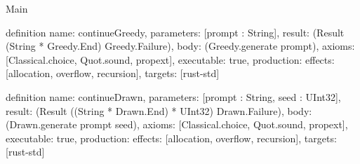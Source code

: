 \begin{lexlean}{Main}
\begin{semanticmodule}
definition{
  name: continueGreedy,
  parameters: [prompt : String],
  result: (Result (String * Greedy.End) Greedy.Failure),
  body: (Greedy.generate prompt),
  axioms: [Classical.choice, Quot.sound, propext],
  executable: true,
  production: {effects: [allocation, overflow, recursion], targets: [rust-std]}
}

definition{
  name: continueDrawn,
  parameters: [prompt : String, seed : UInt32],
  result: (Result ((String * Drawn.End) * UInt32) Drawn.Failure),
  body: (Drawn.generate prompt seed),
  axioms: [Classical.choice, Quot.sound, propext],
  executable: true,
  production: {effects: [allocation, overflow, recursion], targets: [rust-std]}
}
\end{semanticmodule}
\end{lexlean}
